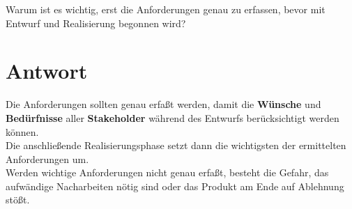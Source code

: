 Warum ist es wichtig, erst die Anforderungen genau zu erfassen, bevor mit Entwurf
und Realisierung begonnen wird?

\section*{Antwort}
Die Anforderungen sollten genau erfaßt werden, damit die \textbf{Wünsche} und \textbf{Bedürfnisse} aller \textbf{Stakeholder} während des Entwurfs berücksichtigt werden können.\\
Die anschließende Realisierungsphase setzt dann die wichtigsten der ermittelten Anforderungen um.\\
Werden wichtige Anforderungen nicht genau erfaßt, besteht die Gefahr, das aufwändige Nacharbeiten nötig sind oder das Produkt am Ende auf Ablehnung stößt.
